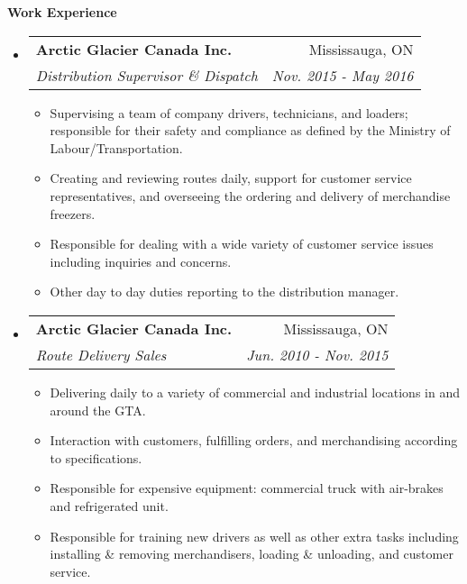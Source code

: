 \documentclass[letterpaper,11pt]{article}
\makeatletter
\newcommand{\resitem}[1]{\item #1 \vspace{-2pt}}
\newcommand{\ressubheading}[4]{
\begin{tabular*}{6.5in}{l@{\extracolsep{\fill}}r}
		\textbf{#1} & #2 \\
		\textit{#3} & \textit{#4} \\
\end{tabular*}\vspace{-6pt}}
\makeatother
\begin{document}
\begin{mdframed}[backgroundcolor=light-gray]
\textbf{Work Experience}
\end{mdframed}
\begin{itemize}
\item
	\ressubheading{Arctic Glacier Canada Inc.}{Mississauga, ON}{Distribution Supervisor \& Dispatch}{Nov. 2015 - May 2016}
	\begin{itemize}
		\resitem{Supervising a team of company drivers, technicians, and loaders; responsible for their safety and compliance as defined by the Ministry of Labour/Transportation.}
		\resitem{Creating and reviewing routes daily, support for customer service representatives, and overseeing the ordering and delivery of merchandise freezers.}
		\resitem{Responsible for dealing with a wide variety of customer service issues including inquiries and concerns.}
		\resitem{Other day to day duties reporting to the distribution manager.}
	\end{itemize}
\item
	\ressubheading{Arctic Glacier Canada Inc.}{Mississauga, ON}{Route Delivery Sales}{Jun. 2010 - Nov. 2015}
	\begin{itemize}
		\resitem{Delivering daily to a variety of commercial and industrial locations in and around the GTA.}
		\resitem{Interaction with customers, fulfilling orders, and merchandising according to specifications.}
		\resitem{Responsible for expensive equipment: commercial truck with air-brakes and refrigerated unit.}
		\resitem{Responsible for training new drivers as well as other extra tasks including installing \& removing merchandisers, loading \& unloading, and customer service.}
	\end{itemize}
\end{itemize}
\end{document}

